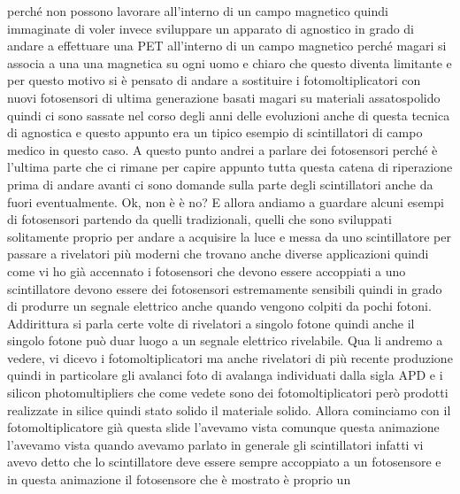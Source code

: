 perché non possono lavorare all'interno di un campo magnetico quindi immaginate di voler invece sviluppare un apparato di agnostico in grado di andare a effettuare una PET all'interno di un campo magnetico perché magari si associa a una una magnetica su ogni uomo e chiaro che questo diventa limitante e per questo motivo si è pensato di andare a sostituire i fotomoltiplicatori con nuovi fotosensori di ultima generazione basati magari su materiali assatospolido quindi ci sono sassate nel corso degli anni delle evoluzioni anche di questa tecnica di agnostica e questo appunto era un tipico esempio di scintillatori di campo medico in questo caso. A questo punto andrei a parlare dei fotosensori perché è l'ultima parte che ci rimane per capire appunto tutta questa catena di riperazione prima di andare avanti ci sono domande sulla parte degli scintillatori anche da fuori eventualmente. Ok, non è è no? E allora andiamo a guardare alcuni esempi di fotosensori partendo da quelli tradizionali, quelli che sono sviluppati solitamente proprio per andare a acquisire la luce e messa da uno scintillatore per passare a rivelatori più moderni che trovano anche diverse applicazioni quindi come vi ho già accennato i fotosensori che devono essere accoppiati a uno scintillatore devono essere dei fotosensori estremamente sensibili quindi in grado di produrre un segnale elettrico anche quando vengono colpiti da pochi fotoni. Addirittura si parla certe volte di rivelatori a singolo fotone quindi anche il singolo fotone può duar luogo a un segnale elettrico rivelabile. Qua li andremo a vedere, vi dicevo i fotomoltiplicatori ma anche rivelatori di più recente produzione quindi in particolare gli avalanci foto di avalanga individuati dalla sigla APD e i silicon photomultipliers che come vedete sono dei fotomoltiplicatori però prodotti realizzate in silice quindi stato solido il materiale solido. Allora cominciamo con il fotomoltiplicatore già questa slide l'avevamo vista comunque questa animazione l'avevamo vista quando avevamo parlato in generale gli scintillatori infatti vi avevo detto che lo scintillatore deve essere sempre accoppiato a un fotosensore e in questa animazione il fotosensore che è mostrato è proprio un 

